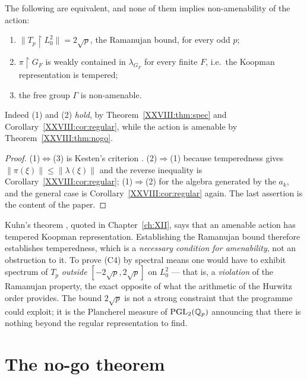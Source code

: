 \begin{theorem}\label{XXVIII:thm:vacuous}
The following are equivalent, and none of them implies non-amenability of the action:
\begin{enumerate}
\item $\|T_p\restriction L^2_0\|=2\sqrt p$, the Ramanujan bound, for every odd $p$;
\item $\pi\restriction G_F$ is weakly contained in $\lambda_{G_F}$ for every finite $F$, i.e.\ the
Koopman representation is tempered;
\item the free group $\Gamma$ is non-amenable.
\end{enumerate}
Indeed (1) and (2) \emph{hold}, by Theorem~\ref{XXVIII:thm:spec} and Corollary~\ref{XXVIII:cor:regular}, while
the action is amenable by Theorem~\ref{XXVIII:thm:nogo}.
\end{theorem}

\begin{proof}
(1)$\Leftrightarrow$(3) is Kesten's criterion \cite{Kesten}. (2)$\Rightarrow$(1) because temperedness gives
$\|\pi(\xi)\|\le\|\lambda(\xi)\|$ and the reverse inequality is Corollary~\ref{XXVIII:cor:regular};
(1)$\Rightarrow$(2) for the algebra generated by the $a_k$, and the general case is
Corollary~\ref{XXVIII:cor:regular} again. The last assertion is the content of the paper.
\end{proof}

\begin{remark}\label{XXVIII:rem:orientation}
Kuhn's theorem \cite{Kuhn}, quoted in Chapter~\ref{ch:XII}, says that an amenable action has tempered
Koopman representation. Establishing the Ramanujan bound therefore establishes temperedness, which is a
\emph{necessary condition for amenability}, not an obstruction to it. To prove (C4) by spectral
means one would have to exhibit spectrum of $T_p$ \emph{outside} $[-2\sqrt p,2\sqrt p]$ on
$L^2_0$ --- that is, a \emph{violation} of the Ramanujan property, the exact opposite of what the
arithmetic of the Hurwitz order provides. The bound $2\sqrt p$ is not a strong constraint that the
programme could exploit; it is the Plancherel measure of $\mathrm{PGL}_2(\mathbb{Q}_p)$ announcing that
there is nothing beyond the regular representation to find.
\end{remark}

\section{The no-go theorem}\label{XXVIII:sec:nogo}

